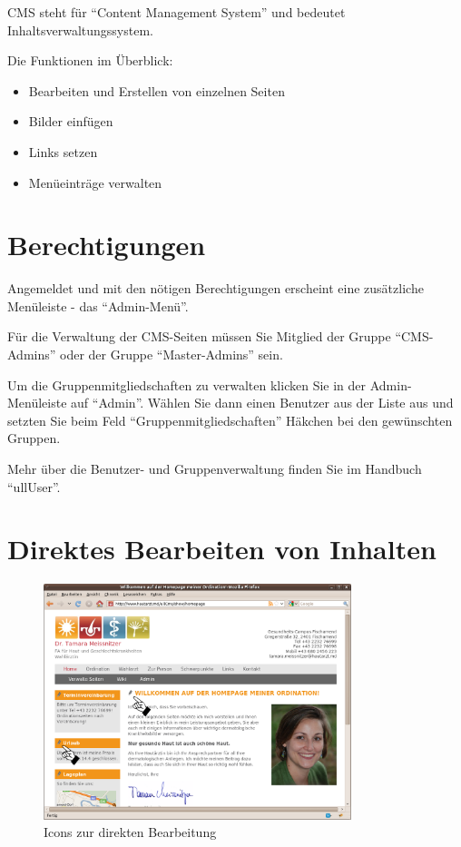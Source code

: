 \documentclass[article, a4paper, oneside, 11pt]{memoir}
\begin{document}
CMS steht für "`Content Management System"' und bedeutet Inhaltsverwaltungssystem.

Die Funktionen im Überblick:

\begin{itemize}
\item Bearbeiten und Erstellen von einzelnen Seiten
\item Bilder einfügen
\item Links setzen
\item Menüeinträge verwalten
\end{itemize}




\section{Berechtigungen}

Angemeldet und mit den nötigen Berechtigungen erscheint eine zusätzliche Menüleiste - das "`Admin-Menü"'. 

Für die Verwaltung der CMS-Seiten müssen Sie Mitglied der Gruppe "`CMS-Admins"' oder der Gruppe "`Master-Admins"' sein.

Um die Gruppenmitgliedschaften zu verwalten klicken Sie in der Admin-Menüleiste auf "`Admin"'. Wählen Sie dann einen Benutzer aus der Liste aus und setzten Sie beim Feld "`Gruppenmitgliedschaften"' Häkchen bei den gewünschten Gruppen.

Mehr über die Benutzer- und Gruppenverwaltung finden Sie im Handbuch "`ullUser"'.


\section{Direktes Bearbeiten von Inhalten}

\begin{figure}[htp]
\centering
\includegraphics[width=0.8\textwidth]{direct_edit}
\caption{Icons zur direkten Bearbeitung}
\label{fig:direct_edit}
\end{figure}
\end{document}
